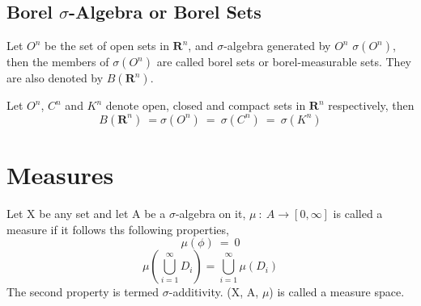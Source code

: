 \subsection{Borel $\sigma$-Algebra or Borel Sets}
\begin{definition}
    Let $O^n$ be the set of open sets in $\bm{R}^n$, and  $\sigma$-algebra
    generated by $O^n$ $\sigma(O^n)$, then the members of $\sigma(O^n)$ are
    called borel sets or borel-measurable sets. They are also denoted by
    $B(\bm{R}^n)$.
\end{definition}
\begin{theorem}
    Let $O^n$, $C^n$ and $K^n$ denote open, closed and compact sets in
    $\bm{R}^n$ respectively, then
    \[
        B(\bm{R}^n) \: = \sigma(O^n) \: = \: \sigma(C^n) \: = \: \sigma(K^n)
    \]
\end{theorem}

\section{Measures}
\begin{definition}
    Let X be any set and let A be a $\sigma$-algebra on it, $\mu \: : \:
    A \rightarrow [0,\infty]$ is called a measure if it follows ths following
    properties,
    \[
        \mu(\phi) \: = \: 0
    \]
    \[
        \mu(\bigcup_{i=1}^{\infty} D_{i}) = \bigcup_{i=1}^{\infty}
        \mu(D_{i})
    \]
    The second property is termed $\sigma$-additivity.
    (X, A, $\mu$) is called a measure space.
\end{definition}

